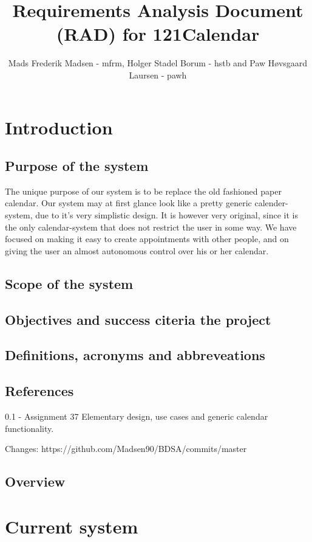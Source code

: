 \documentclass{article}
\begin{document}
\title{Requirements Analysis Document (RAD) for 121Calendar}
\author{Mads Frederik Madsen - mfrm, Holger Stadel Borum - hstb and Paw H\o vsgaard Laursen - pawh}
\maketitle
\tableofcontents

\section{Introduction}
	\subsection{Purpose of the system}
	The unique purpose of our system is to be replace the old fashioned paper calendar. Our system may at first glance look like a pretty generic calender-system, due to it's very simplistic design. It is however very original, since it is the only calendar-system that does not restrict the user in some way. We have focused on making it easy to create appointments with other people, and on giving the user an almost autonomous control over his or her calendar. 
	\subsection{Scope of the system}

	\subsection{Objectives and success citeria the project}
	
	\subsection{Definitions, acronyms and abbreveations}
	
	\subsection{References}
	
	0.1 - Assignment 37
	Elementary design, use cases and generic calendar functionality.

	Changes:
	https://github.com/Madsen90/BDSA/commits/master
	\subsection{Overview}
\section{Current system}
\end{document}
